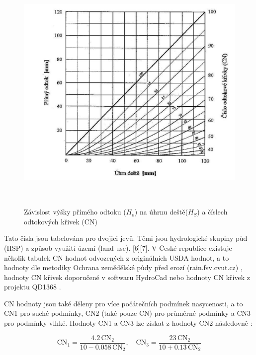 \documentclass[a4paper,oneside,12pt]{book}
\begin{document}
\begin{figure}[ht] \label{obr1}
\centering
\includegraphics[height=12cm]{pictures/CNcurves.jpg}
\caption{ Závislost výšky přímého odtoku ($H_{o}$) na úhrnu deště($H_{S}$) a číslech odtokových křivek (CN) \cite{MNYDGwleJOjKdRUp}}
\label{fig:example}
\end{figure}

 \hspace{10mm} Tato čísla jsou tabelována pro dvojici jevů. Těmi jsou hydrologické skupiny půd (HSP) a způsob využití území (land use). [6][7]. V České republice existuje několik tabulek CN hodnot odvozených z originálních USDA hodnot, a to hodnoty dle metodiky Ochrana zemědělské půdy před erozí (rain.fsv.cvut.cz) \cite{MNYDGwleJOjKdRUp}, hodnoty CN křivek doporučené v softwaru HydroCad nebo hodnoty CN křivek z projektu QD1368 \cite{Kulasova2004}.

 \hspace{10mm} CN hodnoty jsou také děleny pro více počátečních podmínek nasycenosti, a to CN1 pro suché podmínky, CN2 (také pouze CN) pro průměrné podmínky a CN3 pro podmínky vlhké. \cite{dile2016} Hodnoty CN1 a CN3 lze získat z hodnoty CN2 následovně \cite{Batvari2021}:
 
\begin{equation}
\text{CN}_{1} = \frac{4.2 \, \text{CN}_{2}}{10 - 0.058 \, \text{CN}_{2}}, \quad
\text{CN}_{3} = \frac{23 \, \text{CN}_{2}}{10 + 0.13 \, \text{CN}_{2}}
\end{equation}
\end{document}
